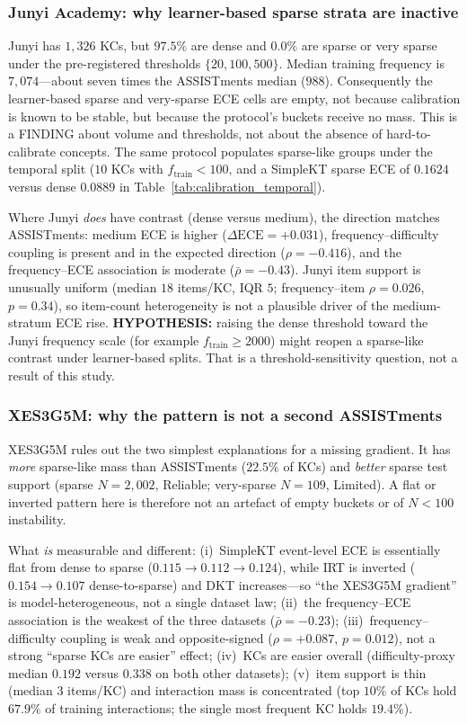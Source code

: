 \subsubsection*{Junyi Academy: why learner-based sparse strata are inactive}
Junyi has $1{,}326$ KCs, but $97.5\%$ are dense and $0.0\%$ are sparse or very sparse under the pre-registered thresholds $\{20,100,500\}$.
Median training frequency is $7{,}074$---about seven times the ASSISTments median ($988$).
Consequently the learner-based sparse and very-sparse ECE cells are empty, not because calibration is known to be stable, but because the protocol's buckets receive no mass.
This is a FINDING about volume and thresholds, not about the absence of hard-to-calibrate concepts.
The same protocol populates sparse-like groups under the temporal split ($10$ KCs with $f_{\mathrm{train}}<100$, and a SimpleKT sparse ECE of $0.1624$ versus dense $0.0889$ in Table~\ref{tab:calibration_temporal}).

Where Junyi \emph{does} have contrast (dense versus medium), the direction matches ASSISTments: medium ECE is higher ($\Delta\mathrm{ECE}=+0.031$), frequency--difficulty coupling is present and in the expected direction ($\rho=-0.416$), and the frequency--ECE association is moderate ($\bar{\rho}=-0.43$).
Junyi item support is unusually uniform (median $18$ items/KC, IQR $5$; frequency--item $\rho=0.026$, $p=0.34$), so item-count heterogeneity is not a plausible driver of the medium-stratum ECE rise.
\textbf{HYPOTHESIS:} raising the dense threshold toward the Junyi frequency scale (for example $f_{\mathrm{train}}\ge 2000$) might reopen a sparse-like contrast under learner-based splits.
That is a threshold-sensitivity question, not a result of this study.

\subsubsection*{XES3G5M: why the pattern is not a second ASSISTments}
XES3G5M rules out the two simplest explanations for a missing gradient.
It has \emph{more} sparse-like mass than ASSISTments ($22.5\%$ of KCs) and \emph{better} sparse test support (sparse $N=2{,}002$, Reliable; very-sparse $N=109$, Limited).
A flat or inverted pattern here is therefore not an artefact of empty buckets or of $N<100$ instability.

What \emph{is} measurable and different:
(i)~SimpleKT event-level ECE is essentially flat from dense to sparse ($0.115\to 0.112\to 0.124$), while IRT is inverted ($0.154\to 0.107$ dense-to-sparse) and DKT increases---so ``the XES3G5M gradient'' is model-heterogeneous, not a single dataset law;
(ii)~the frequency--ECE association is the weakest of the three datasets ($\bar{\rho}=-0.23$);
(iii)~frequency--difficulty coupling is weak and opposite-signed ($\rho=+0.087$, $p=0.012$), not a strong ``sparse KCs are easier'' effect;
(iv)~KCs are easier overall (difficulty-proxy median $0.192$ versus $0.338$ on both other datasets);
(v)~item support is thin (median $3$ items/KC) and interaction mass is concentrated (top $10\%$ of KCs hold $67.9\%$ of training interactions; the single most frequent KC holds $19.4\%$).

